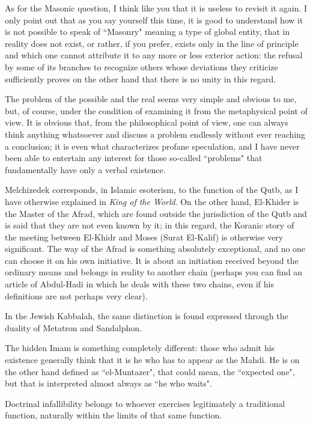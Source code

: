 As for the Masonic question, I think like you that it is useless to revisit it again. I only point out that as you say yourself this time, it is good to understand how it is not possible to speak of ``Masonry" meaning a type of global entity, that in reality does not exist, or rather, if you prefer, exists only in the line of principle and which one cannot attribute it to any more or less exterior action: the refusal by some of its branches to recognize others whose deviations they criticize sufficiently proves on the other hand that there is no unity in this regard.

The problem of the possible and the real seems very simple and obvious to me, but, of course, under the condition of examining it from the metaphysical point of view. It is obvious that, from the philosophical point of view, one can always think anything whatsoever and discuss a problem endlessly without ever reaching a conclusion; it is even what characterizes profane speculation, and I have never been able to entertain any interest for those so-called ``problems" that fundamentally have only a verbal existence.

Melchizedek corresponds, in Islamic esoterism, to the function of the Qutb, as I have otherwise explained in \emph{King of the World}. On the other hand, El-Khider is the Master of the Afrad, which are found outside the jurisdiction of the Qutb and is said that they are not even known by it; in this regard, the Koranic story of the meeting between El-Khidr and Moses (Surat El-Kalif) is otherwise very significant. The way of the Afrad is something absolutely exceptional, and no one can choose it on his own initiative. It is about an initiation received beyond the ordinary means and belongs in reality to another chain (perhaps you can find an article of Abdul-Hadi in which he deals with these two chains, even if his definitions are not perhaps very clear).

In the Jewish Kabbalah, the same distinction is found expressed through the duality of Metatron and Sandalphon.

The hidden Imam is something completely different: those who admit his existence generally think that it is he who has to appear as the Mahdi. He is on the other hand defined as ``el-Muntazer", that could mean, the ``expected one", but that is interpreted almost always as ``he who waits".

Doctrinal infallibility belongs to whoever exercises legitimately a traditional function, naturally within the limits of that same function.


